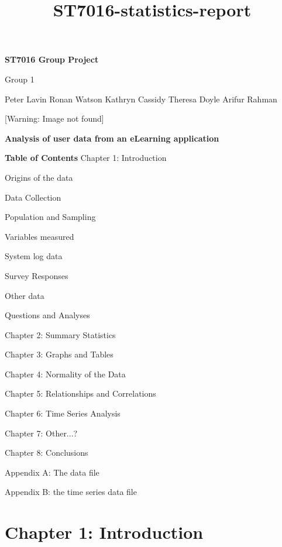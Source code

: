 \documentclass[12pt,twoside]{article}
\title{ST7016{}-statistics{}-report}
\begin{document}
\clearpage\pagestyle{HTML}
{\centering
\textbf{\textup{ST7016 Group Project}} 
\par}

{\centering
Group 1 
\par}

{\centering
Peter Lavin\newline
Ronan Watson\newline
Kathryn Cassidy\newline
Theresa Doyle\newline
Arifur Rahman 
\par}


\bigskip

{\centering

\par}

\begin{center}
[Warning: Image not found]
\end{center}
{\centering
\textbf{Analysis of user data from an eLearning application} 
\par}


\bigskip


\bigskip


\bigskip

\textbf{Table of Contents} 
Chapter 1: Introduction 

Origins of the data

Data Collection

Population and Sampling

Variables measured

System log data

Survey Responses

Other data

Questions and Analyses

Chapter 2: Summary Statistics

Chapter 3: Graphs and Tables

Chapter 4: Normality of the Data

Chapter 5: Relationships and Correlations

Chapter 6: Time Series Analysis

Chapter 7: Other...?

Chapter 8: Conclusions

Appendix A: The data file

Appendix B: the time series data file

\bigskip

\section[Chapter 1: Introduction ]{Chapter 1: Introduction }
\end{document}

